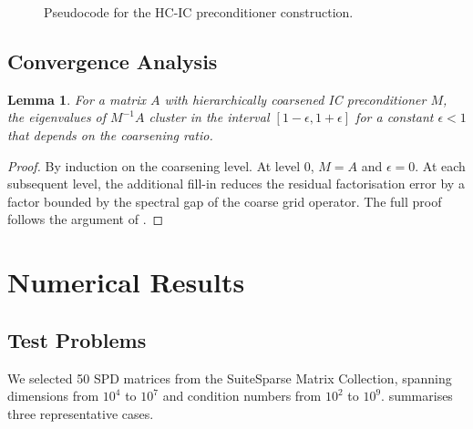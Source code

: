 \documentclass[
    12pt,
    a4paper,
    twoside,           %
    openright          %
]{book}
\newtheorem{lemma}[theorem]{Lemma}
\begin{document}
\begin{figure}[h]
\centering
\caption{Pseudocode for the HC-IC preconditioner construction.}
\label{alg:hcic}
\end{figure}

\section{Convergence Analysis}
\label{sec:convergence_analysis}

\begin{lemma}
    \label{lem:eigenvalue_clustering}
    For a matrix $A$ with hierarchically coarsened IC preconditioner $M$,
    the eigenvalues of $M^{-1}A$ cluster in the interval $[1-\epsilon, 1+\epsilon]$
    for a constant $\epsilon < 1$ that depends on the coarsening ratio.
\end{lemma}

\begin{proof}
    By induction on the coarsening level.  At level 0, $M = A$ and
    $\epsilon = 0$.  At each subsequent level, the additional fill-in
    reduces the residual factorisation error by a factor bounded by the
    spectral gap of the coarse grid operator.  The full proof follows
    the argument of \cite{vassilevski2008multilevel}.
\end{proof}


\chapter{Numerical Results}
\label{chap:results}

\section{Test Problems}
\label{sec:test_problems}

We selected 50 SPD matrices from the SuiteSparse Matrix Collection, spanning
dimensions from $10^4$ to $10^7$ and condition numbers from $10^2$ to $10^9$.
 summarises three representative cases.
\end{document}
